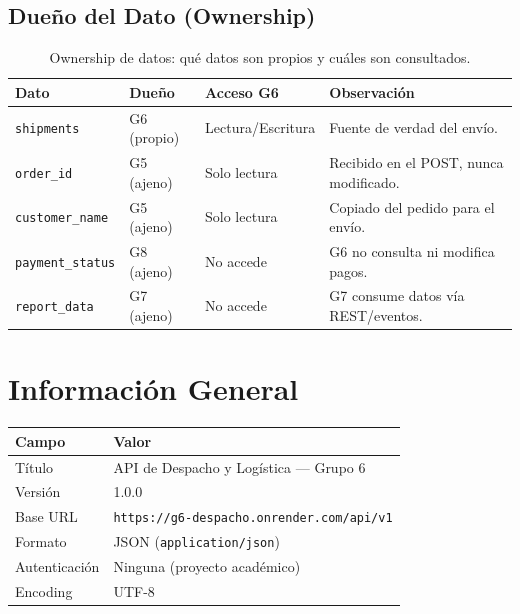 \documentclass[11pt, a4paper]{article}
\begin{document}
\subsection{Dueño del Dato (Ownership)}

\begin{table}[h!]
\centering
\renewcommand{\arraystretch}{1.3}
\begin{tabularx}{\textwidth}{l l l X}
  \toprule
  \textbf{Dato} & \textbf{Dueño} & \textbf{Acceso G6} & \textbf{Observación} \\
  \midrule
  \texttt{shipments}        & G6 (propio)  & Lectura/Escritura & Fuente de verdad del envío. \\
  \texttt{order\_id}        & G5 (ajeno)   & Solo lectura      & Recibido en el POST, nunca modificado. \\
  \texttt{customer\_name}   & G5 (ajeno)   & Solo lectura      & Copiado del pedido para el envío. \\
  \texttt{payment\_status}  & G8 (ajeno)   & No accede          & G6 no consulta ni modifica pagos. \\
  \texttt{report\_data}     & G7 (ajeno)   & No accede          & G7 consume datos vía REST/eventos. \\
  \bottomrule
\end{tabularx}
\caption{Ownership de datos: qué datos son propios y cuáles son consultados.}
\end{table}


\section{Información General}
\label{sec:general-info}

\begin{table}[h!]
\centering
\renewcommand{\arraystretch}{1.4}
\begin{tabularx}{\textwidth}{l X}
  \toprule
  \textbf{Campo} & \textbf{Valor} \\
  \midrule
  Título          & API de Despacho y Logística --- Grupo 6 \\
  Versión         & 1.0.0 \\
  Base URL        & \texttt{https://g6-despacho.onrender.com/api/v1} \\
  Formato         & JSON (\texttt{application/json}) \\
  Autenticación   & Ninguna (proyecto académico) \\
  Encoding        & UTF-8 \\
  \bottomrule
\end{tabularx}
\end{table}
\end{document}
